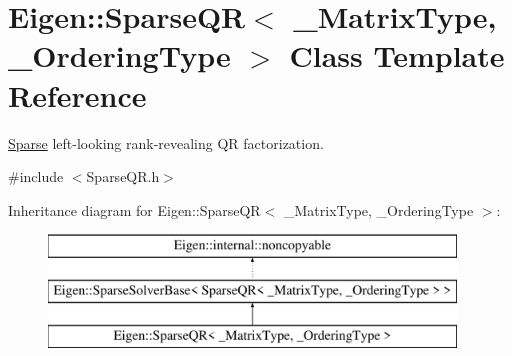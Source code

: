 \hypertarget{class_eigen_1_1_sparse_q_r}{}\section{Eigen\+::Sparse\+QR$<$ \+\_\+\+Matrix\+Type, \+\_\+\+Ordering\+Type $>$ Class Template Reference}
\label{class_eigen_1_1_sparse_q_r}


\mbox{\hyperlink{struct_eigen_1_1_sparse}{Sparse}} left-\/looking rank-\/revealing QR factorization.  




{\ttfamily \#include $<$Sparse\+Q\+R.\+h$>$}

Inheritance diagram for Eigen\+::Sparse\+QR$<$ \+\_\+\+Matrix\+Type, \+\_\+\+Ordering\+Type $>$\+:\begin{figure}[H]
\begin{center}
\leavevmode
\includegraphics[height=3.000000cm]{class_eigen_1_1_sparse_q_r}
\end{center}
\end{figure}
